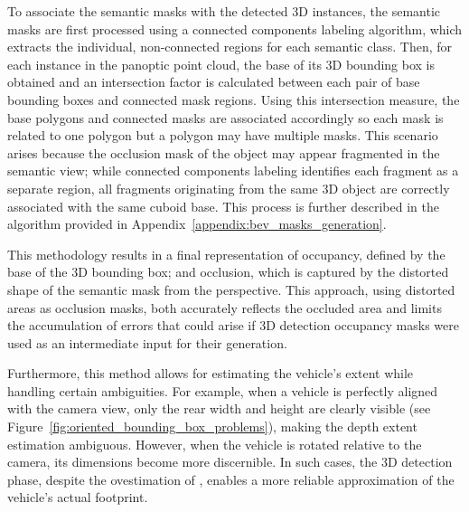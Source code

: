 To associate the  semantic masks with the detected 3D instances, the semantic masks are first processed using a connected components labeling algorithm, which extracts the individual, non-connected regions for each semantic class. Then, for each instance in the panoptic point cloud, the base of its 3D bounding box is obtained and an intersection factor is calculated between each pair of base bounding boxes and connected mask regions. Using this intersection measure, the base polygons and connected masks are associated accordingly so each mask is related to one polygon but a polygon may have multiple masks. This scenario arises because the occlusion mask of the object may appear fragmented in the  semantic view; while connected components labeling identifies each fragment as a separate region, all fragments originating from the same 3D object are correctly associated with the same cuboid base. This process is further described in the algorithm provided in Appendix~\ref{appendix:bev_masks_generation}.

This methodology results in a final representation of occupancy, defined by the base of the 3D bounding box; and occlusion, which is captured by the distorted shape of the semantic mask from the  perspective. This approach, using distorted areas as occlusion masks, both accurately reflects the occluded area and limits the accumulation of errors that could arise if 3D detection occupancy masks were used as an intermediate input for their generation.

Furthermore, this method allows for estimating the vehicle's extent while handling certain ambiguities. For example, when a vehicle is perfectly aligned with the camera view, only the rear width and height are clearly visible (see Figure~\ref{fig:oriented_bounding_box_problems}), making the depth extent estimation ambiguous. However, when the vehicle is rotated relative to the camera, its dimensions become more discernible. In such cases, the 3D detection phase, despite the ovestimation of , enables a more reliable approximation of the vehicle's actual footprint.

